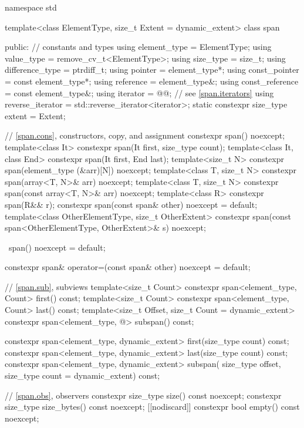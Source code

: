 %
\begin{codeblock}
namespace std {
  template<class ElementType, size_t Extent = dynamic_extent>
  class span {
  public:
    // constants and types
    using element_type = ElementType;
    using value_type = remove_cv_t<ElementType>;
    using size_type = size_t;
    using difference_type = ptrdiff_t;
    using pointer = element_type*;
    using const_pointer = const element_type*;
    using reference = element_type&;
    using const_reference = const element_type&;
    using iterator = @@;        // see \ref{span.iterators}
    using reverse_iterator = std::reverse_iterator<iterator>;
    static constexpr size_type extent = Extent;

    // \ref{span.cons}, constructors, copy, and assignment
    constexpr span() noexcept;
    template<class It>
      constexpr span(It first, size_type count);
    template<class It, class End>
      constexpr span(It first, End last);
    template<size_t N>
      constexpr span(element_type (&arr)[N]) noexcept;
    template<class T, size_t N>
      constexpr span(array<T, N>& arr) noexcept;
    template<class T, size_t N>
      constexpr span(const array<T, N>& arr) noexcept;
    template<class R>
      constexpr span(R&& r);
    constexpr span(const span& other) noexcept = default;
    template<class OtherElementType, size_t OtherExtent>
      constexpr span(const span<OtherElementType, OtherExtent>& s) noexcept;

    ~span() noexcept = default;

    constexpr span& operator=(const span& other) noexcept = default;

    // \ref{span.sub}, subviews
    template<size_t Count>
      constexpr span<element_type, Count> first() const;
    template<size_t Count>
      constexpr span<element_type, Count> last() const;
    template<size_t Offset, size_t Count = dynamic_extent>
      constexpr span<element_type, @\seebelow@> subspan() const;

    constexpr span<element_type, dynamic_extent> first(size_type count) const;
    constexpr span<element_type, dynamic_extent> last(size_type count) const;
    constexpr span<element_type, dynamic_extent> subspan(
      size_type offset, size_type count = dynamic_extent) const;

    // \ref{span.obs}, observers
    constexpr size_type size() const noexcept;
    constexpr size_type size_bytes() const noexcept;
    [[nodiscard]] constexpr bool empty() const noexcept;

}}
\end{codeblock}
